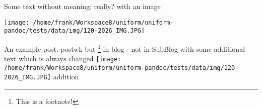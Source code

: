 \documentclass[a4paper,10pt]{scrbook}
\begin{document}
Some text without meaning; really? with an image

\texttt{[image: /home/frank/Workspace8/uniform/uniform-pandoc/tests/data/img/120-2026\_IMG.JPG]}

An example post. postwk but \footnote{This is a footnote!} in blog - not
in SubBlog with some additional text which is always changed
\texttt{[image: /home/frank/Workspace8/uniform/uniform-pandoc/tests/data/img/120-2026\_IMG.JPG]}
addition

\printindex
\end{document}
